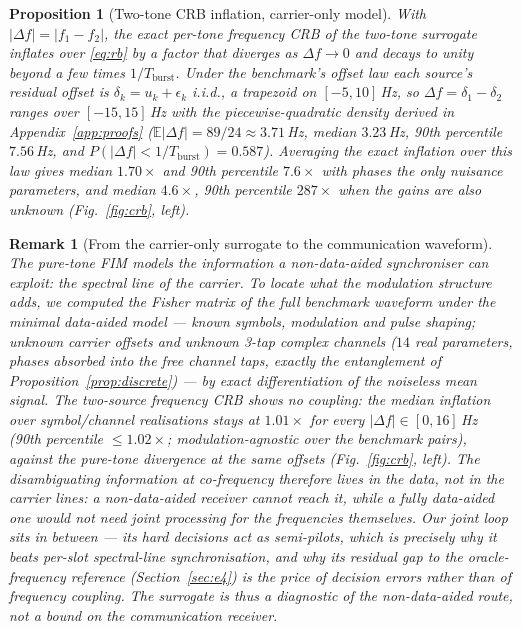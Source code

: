 \documentclass[journal]{IEEEtran}
\newtheorem{proposition}{Proposition}
\newtheorem{remark}{Remark}
\begin{document}
\begin{proposition}[Two-tone CRB inflation, carrier-only model]
\label{prop:crb}
With $|\Delta f| = |f_1 - f_2|$, the exact per-tone frequency CRB of
the two-tone surrogate inflates over \eqref{eq:rb} by a factor that
diverges as $\Delta f \to 0$ and decays to unity beyond a few times
$1/T_{\mathrm{burst}}$. Under the benchmark's offset law each source's
residual offset is $\delta_k = u_k + \epsilon_k$ i.i.d., a trapezoid
on $[-5, 10]$\,Hz, so $\Delta f = \delta_1 - \delta_2$ ranges over
$[-15, 15]$\,Hz with the piecewise-quadratic density derived in
Appendix~\ref{app:proofs} ($\mathbb{E}|\Delta f| = 89/24 \approx
3.71$\,Hz, median $3.23$\,Hz, 90th percentile $7.56$\,Hz, and
$P(|\Delta f| < 1/T_{\mathrm{burst}}) = 0.587$). Averaging the exact
inflation over this law gives median $1.70\times$ and 90th percentile
$7.6\times$ with phases the only nuisance parameters, and median
$4.6\times$, 90th percentile $287\times$ when the gains are also
unknown (Fig.~\ref{fig:crb}, left).
\end{proposition}

\begin{remark}[From the carrier-only surrogate to the communication
waveform]
\label{rem:waveform-fim}
The pure-tone FIM models the information a \emph{non-data-aided}
synchroniser can exploit: the spectral line of the carrier. To locate
what the modulation structure adds, we computed the Fisher matrix of
the full benchmark waveform under the minimal data-aided model ---
known symbols, modulation and pulse shaping; unknown carrier
offsets and unknown 3-tap complex channels ($14$ real parameters,
phases absorbed into the free channel taps, exactly the entanglement
of Proposition~\ref{prop:discrete}) --- by exact differentiation of
the noiseless mean signal. The two-source frequency CRB shows
\emph{no} coupling:
the median inflation over symbol/channel realisations stays at
$1.01\times$ for every $|\Delta f| \in [0, 16]$\,Hz (90th percentile
$\leq 1.02\times$; modulation-agnostic over the benchmark pairs),
against the pure-tone divergence at the same offsets
(Fig.~\ref{fig:crb}, left). The disambiguating information at
co-frequency therefore lives in the data, not in the carrier lines: a
non-data-aided receiver cannot reach it, while a fully data-aided one
would not need joint processing for the frequencies themselves. Our
joint loop sits in between --- its hard decisions act as semi-pilots,
which is precisely why it beats per-slot spectral-line synchronisation,
and why its residual gap to the oracle-frequency reference
(Section~\ref{sec:e4}) is the price of decision errors rather than of
frequency coupling. The surrogate is thus a diagnostic of the
non-data-aided route, not a bound on the communication receiver.
\end{remark}
\end{document}
